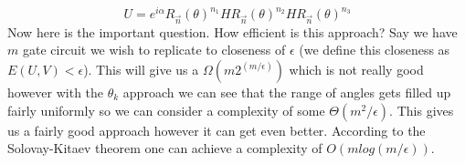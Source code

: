 \documentclass{report}
\begin{document}
\begin{equation}
U = e^{i\alpha}{R_{\vec{n}}(\theta)}^{n_1}H{R_{\vec{n}}(\theta)}^{n_2}H{R_{\vec{n}}(\theta)}^{n_3}
\end{equation}
Now here is the important question. How efficient is this approach? Say we have $m$ gate circuit we wish to replicate to closeness of $\epsilon$ (we define this closeness as $E(U,V) < \epsilon$). This will give us a $\Omega(m2^{(m/\epsilon)})$ which is not really good however with the $\theta_k$ approach we can see that the range of angles gets filled up fairly uniformly so we can consider a complexity of some $\Theta(m^2/\epsilon)$. This gives us a fairly good approach however it can get even better. According to the Solovay-Kitaev theorem one can achieve a complexity of $O(mlog(m/\epsilon))$.\\
\end{document}
